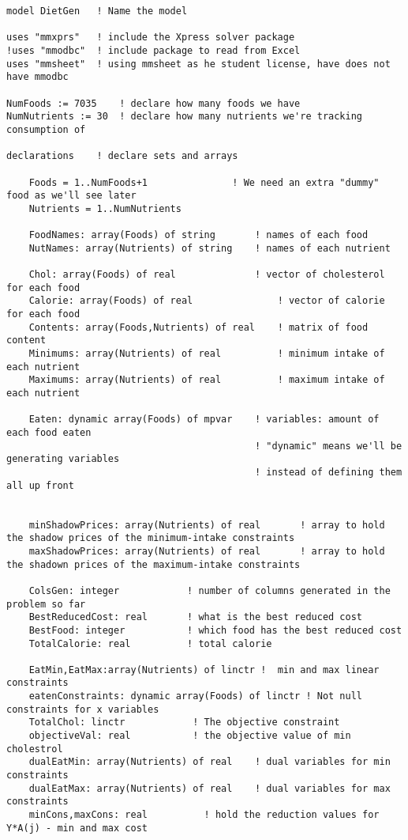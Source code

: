 \documentclass[twoside,12pt]{article}
\begin{document}
\begin{verbatim}
model DietGen	! Name the model

uses "mmxprs"	! include the Xpress solver package
!uses "mmodbc"	! include package to read from Excel
uses "mmsheet"  ! using mmsheet as he student license, have does not have mmodbc

NumFoods := 7035	! declare how many foods we have
NumNutrients := 30	! declare how many nutrients we're tracking consumption of

declarations	! declare sets and arrays

	Foods = 1..NumFoods+1 				! We need an extra "dummy" food as we'll see later
	Nutrients = 1..NumNutrients
	
	FoodNames: array(Foods) of string		! names of each food
	NutNames: array(Nutrients) of string	! names of each nutrient
		
	Chol: array(Foods) of real				! vector of cholesterol for each food
	Calorie: array(Foods) of real				! vector of calorie for each food
	Contents: array(Foods,Nutrients) of real	! matrix of food content
	Minimums: array(Nutrients) of real			! minimum intake of each nutrient
	Maximums: array(Nutrients) of real	 		! maximum intake of each nutrient
		
	Eaten: dynamic array(Foods) of mpvar	! variables: amount of each food eaten
											! "dynamic" means we'll be generating variables
											! instead of defining them all up front
	

	minShadowPrices: array(Nutrients) of real		! array to hold the shadow prices of the minimum-intake constraints
	maxShadowPrices: array(Nutrients) of real		! array to hold the shadown prices of the maximum-intake constraints
									
	ColsGen: integer			! number of columns generated in the problem so far
	BestReducedCost: real		! what is the best reduced cost
	BestFood: integer			! which food has the best reduced cost
	TotalCalorie: real			! total calorie
	
	EatMin,EatMax:array(Nutrients) of linctr !  min and max linear constraints
	eatenConstraints: dynamic array(Foods) of linctr ! Not null constraints for x variables
	TotalChol: linctr            ! The objective constraint
	objectiveVal: real           ! the objective value of min cholestrol
	dualEatMin: array(Nutrients) of real    ! dual variables for min constraints
	dualEatMax: array(Nutrients) of real    ! dual variables for max constraints
	minCons,maxCons: real          ! hold the reduction values for Y*A(j) - min and max cost
	

\end{verbatim}
\end{document}
